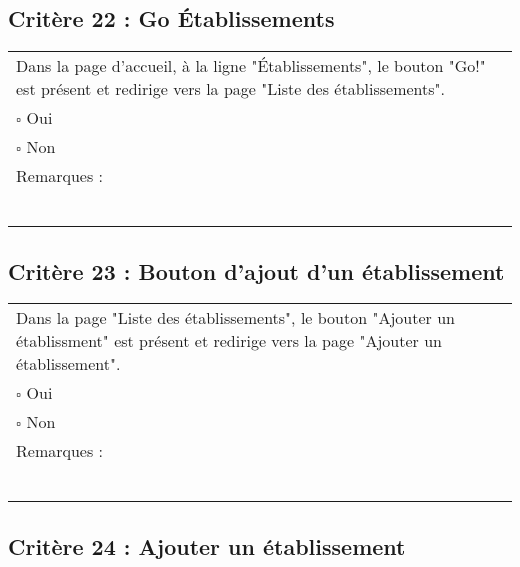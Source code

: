   		
  		  	\subsection*{Critère 22 : Go Établissements}
	
	\begin{center}
    	 		\begin{tabular}[h]{|p{}|}
			\hline
				Dans la page d'accueil, à la ligne "Établissements", le bouton "Go!" est présent et redirige vers la page "Liste des établissements".\\
				$\square$ Oui  \\ $\square$ Non \\\hline Remarques : \\ ~\\
			 \\\hline
     		\end{tabular}
  		\end{center}	
  		
  		
  	\subsection*{Critère 23 : Bouton d'ajout d'un établissement}
	
	\begin{center}
    	 		\begin{tabular}[h]{|p{}|}
			\hline
				Dans la page "Liste des établissements", le bouton "Ajouter un établissment" est présent et redirige vers la page "Ajouter un établissement".\\
				$\square$ Oui  \\ $\square$ Non \\\hline Remarques : \\ ~\\
			 \\\hline
     		\end{tabular}
  		\end{center}	
  		
  		
  	\subsection*{Critère 24 : Ajouter un établissement}
	
